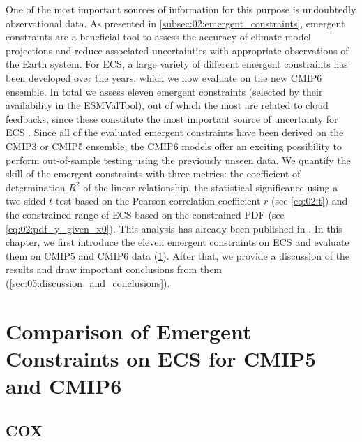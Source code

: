 One of the most important sources of information for this purpose is
undoubtedly observational data. As presented in
\cref{subsec:02:emergent_constraints}, emergent constraints are a beneficial
tool to assess the accuracy of climate model projections and reduce associated
uncertainties with appropriate observations of the Earth system. For \ac{ECS},
a large variety of different emergent constraints has been developed over the
years, which we now evaluate on the new \acs{CMIP}6 ensemble. In total we
assess eleven emergent constraints (selected by their availability in the
\ac{ESMValTool}), out of which the most are related to cloud feedbacks, since
these constitute the most important source of uncertainty for \ac{ECS}
. Since all of the evaluated emergent
constraints have been derived on the \acs{CMIP}3 or \ac{CMIP}5 ensemble, the
\ac{CMIP}6 models offer an exciting possibility to perform out-of-sample
testing using the previously unseen data. We quantify the skill of the emergent
constraints with three metrics: the coefficient of determination $R^2$ of the
linear relationship, the statistical significance using a two-sided $t$-test
based on the Pearson correlation coefficient $r$ (see \cref{eq:02:t}) and the
constrained range of \ac{ECS} based on the constrained \ac{PDF} (see
\cref{eq:02:pdf_y_given_x0}). This analysis has already been published in
\textcite{Schlund2020a}. In this chapter, we first introduce the eleven
emergent constraints on \acs{ECS} and evaluate them on \acs{CMIP}5 and
\acs{CMIP}6 data (\cref{sec:05:comparison_of_emergent_constraints}). After
that, we provide a discussion of the results and draw important conclusions
from them (\cref{sec:05:discussion_and_conclusions}).


\section{Comparison of Emergent Constraints on \acs{ECS} for \acs{CMIP}5 and
  \acs{CMIP}6}
\label{sec:05:comparison_of_emergent_constraints}


\subsection{COX}
\label{subsec:05:cox}

